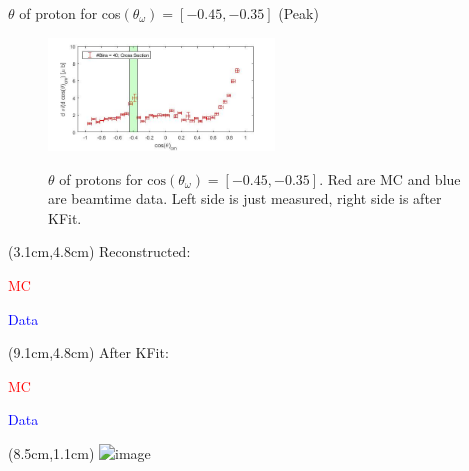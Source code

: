 \documentclass[
		10pt
		]{beamer}
\begin{document}
\begin{frame}{$ \theta$ of proton for cos$(\theta_{\omega})=[-0.45,-0.35]$ (Peak)}
	
	\begin{figure}
		\hspace{0cm}  \vspace{-1cm}
		\includegraphics[width=6cm]{Plots/6}
	\end{figure}
	
	
	\begin{figure}%
		\centering
		\qquad
		\captionsetup{labelformat=empty}
		\caption{$\theta$ of protons for $\textrm{cos}(\theta_{\omega}) = [-0.45, -0.35] $. Red are MC and blue are beamtime data. Left side is just measured, right side is after KFit.}%

	\end{figure}
	
	\begin{textblock*}{4.5cm}(3.1cm,4.8cm)
		\footnotesize Reconstructed:
		
		\footnotesize \textcolor{red}{MC}
		
		\footnotesize \textcolor{blue}{Data}
	\end{textblock*}
	
	\begin{textblock*}{4.5cm}(9.1cm,4.8cm)
		\footnotesize After KFit:
		
		\footnotesize \textcolor{red}{MC}
		
		\footnotesize \textcolor{blue}{Data}
	\end{textblock*}
	
	\begin{textblock*}{4.5cm}(8.5cm,1.1cm)
	\includegraphics<2>[width=3.8cm]{Plots/CB}
\end{textblock*}
	
	
\end{frame}
\end{document}
